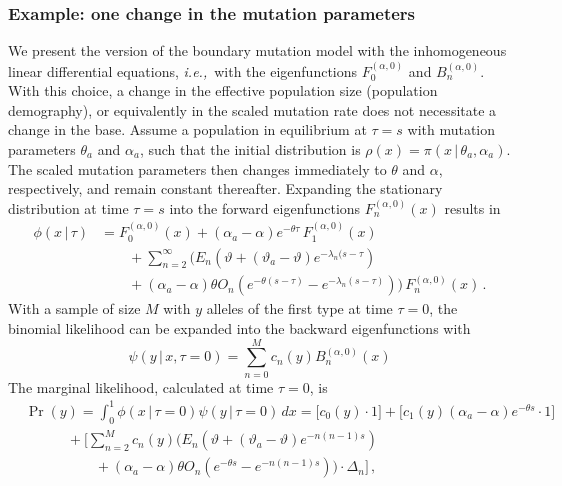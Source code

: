 \documentclass[preprint]{elsarticle}
\newcommand\given{{\,|\,}}
\newcommand\ie{{\it i.e.,}}
\newcommand\y{\ensuremath{y}}
\begin{document}
\subsubsection{Example: one change in the mutation parameters}

We present the version of the boundary mutation model with the inhomogeneous linear differential equations, \ie\ with the eigenfunctions $F_0^{(\alpha,0)}$ and $B_n^{(\alpha,0)}$. With this choice, a change in the effective population size (population demography), or equivalently in the scaled mutation rate does not necessitate a change in the base. Assume a population in equilibrium at $\tau=s$ with mutation parameters $\theta_a$ and $\alpha_a$, such that the initial distribution is $\rho(x)=\pi(x\given\theta_a,\alpha_a)$. The scaled mutation parameters then changes immediately to $\theta$ and $\alpha$, respectively, and remain constant thereafter. 
Expanding the stationary distribution at time $\tau=s$ into the forward eigenfunctions $F_n^{(\alpha,0)}(x)$ results in
\begin{equation}
\begin{split}
    \phi(x\given\tau)&= F_0^{(\alpha,0)}(x)+(\alpha_a-\alpha) e^{-\theta \tau}\,F_1^{(\alpha,0)}(x)\\
    &\qquad+\sum_{n=2}^\infty \bigg(E_n(\vartheta+(\vartheta_a-\vartheta) e^{-\lambda_n(s-\tau})\\
    &\qquad
    +(\alpha_a-\alpha) \theta O_n (e^{-\theta (s-\tau)}-e^{-\lambda_n (s-\tau)})\bigg)\,F_n^{(\alpha,0)}(x)\,.
\end{split}
\end{equation}
With a sample of size $M$ with $y$ alleles of the first type at time $\tau=0$, the binomial likelihood can be expanded into the backward eigenfunctions with 
\begin{equation}
    \psi(\y\given x,\tau=0)=\sum_{n=0}^M c_n(y) B_n^{(\alpha,0)}(x)
\end{equation}
The marginal likelihood, calculated at time $\tau=0$, is
\begin{equation}
\begin{split}
    &\Pr(\y)=\int_0^1 \phi(x\given\tau=0)\psi(\y\given \tau=0)\,dx=\bigg[c_0(\y)\cdot 1\bigg]+\bigg[c_1(\y)(\alpha_a-\alpha) e^{-\theta s}\cdot 1\bigg]\\
    &\qquad\quad+\bigg[\sum_{n=2}^M c_n(\y)\bigg(E_n(\vartheta+(\vartheta_a-\vartheta) e^{-n(n-1)s}) \\
    &\quad\qquad\qquad+(\alpha_a-\alpha)\theta O_n (e^{-\theta s}-e^{-n(n-1) s})\bigg)\cdot\Delta_n\bigg]\,,\
\end{split}
\end{equation}
\end{document}
